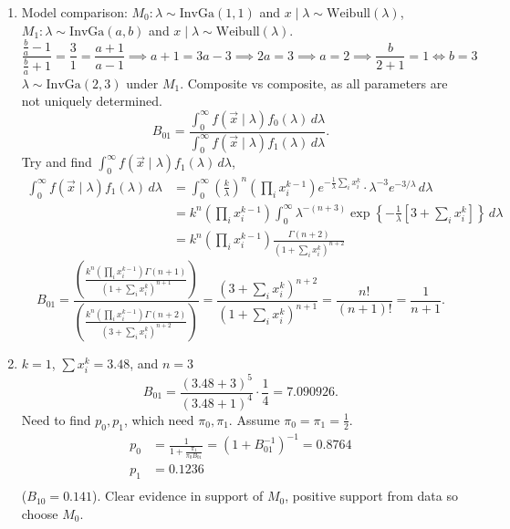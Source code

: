 \documentclass[10pt, a4paper]{article}
\begin{document}
\begin{problem}
\begin{solution}
\begin{enumerate}[label = (\arabic*)]
            \item
            Model comparison:
            $M_0 : \lambda \sim \mathrm{InvGa}(1, 1)$ and $x \mid \lambda \sim \mathrm{Weibull}(\lambda)$,
            $M_1 : \lambda \sim \mathrm{InvGa}(a, b)$ and $x \mid \lambda \sim \mathrm{Weibull}(\lambda)$.
            \[
            \frac{\frac{b}{a} - 1}{\frac{b}{a} + 1} = \frac{3}{1} = \frac{a + 1}{a - 1} \implies a + 1 = 3a - 3 \implies 2a = 3 \implies a = 2 \implies \frac{b}{2 + 1} = 1 \iff b = 3
            \]
            $\lambda \sim \mathrm{InvGa}(2, 3)$ under $M_1$.
            Composite vs composite,
            as all parameters are not uniquely determined.
            \[
            B_{01} = \frac{\int_{0}^{\infty}f(\vec{x} \mid \lambda)f_0(\lambda)\,d\lambda}{\int_{0}^{\infty}f(\vec{x}\mid \lambda)f_1(\lambda)\,d\lambda}.
            \]
            Try and find $\int_{0}^{\infty}f(\vec{x}\mid \lambda)f_1(\lambda)\,d\lambda$,
            \begin{align*}
                \int_{0}^{\infty}f(\vec{x}\mid \lambda)f_1(\lambda)\,d\lambda &= \int_{0}^{\infty}\left(\frac{k}{\lambda}\right) ^ n\left(\prod_{i}x_i ^ {k - 1}\right)e ^ {-\frac{1}{\lambda}\sum_{i}x_i ^ k}\cdot\lambda ^ {-3}e ^ {-3 / \lambda}\,d\lambda \\
                &= k ^ n\left(\prod_{i}x_i ^ {k - 1}\right)\int_{0}^{\infty}\lambda ^ {-(n + 3)}\exp\left\{-\frac{1}{\lambda}\left[3 + \sum_{i}x_i ^ k\right]\right\}\,d\lambda \\
                &= k ^ n\left(\prod_{i}x_i ^ {k - 1}\right)\frac{\Gamma(n + 2)}{\left(1 + \sum_{i}x_i ^ k\right) ^ {n + 2}}
            \end{align*}
            \[
            B_{01} = \frac{\left(\frac{k ^ n\left(\prod_{i}x_i ^ {k - 1}\right)\Gamma(n + 1)}{\left(1 + \sum_{i}x_i ^ k\right) ^ {n + 1}}\right)}{\left(\frac{k ^ n\left(\prod_{i}x_i ^ {k - 1}\right)\Gamma(n + 2)}{\left(3 + \sum_{i}x_i ^ k\right) ^ {n + 2}}\right)} = \frac{\left(3 + \sum_{i}x_i ^ k\right) ^ {n + 2}}{\left(1 + \sum_{i}x_i ^ k\right) ^ {n + 1}} = \frac{n!}{(n + 1)!} = \frac{1}{n + 1}.
            \]

            \item
            $k = 1$,
            $\sum x_i ^ k = 3.48$,
            and $n = 3$
            \[
            B_{01} = \frac{(3.48 + 3) ^ 5}{(3.48 + 1) ^ 4} \cdot \frac{1}{4} = 7.090926.
            \]
            Need to find $p_0, p_1$,
            which need $\pi_0, \pi_1$.
            Assume $\pi_0 = \pi_1 = \frac{1}{2}$.
            \begin{align*}
                p_0 &= \frac{1}{1 + \frac{\pi_1}{\pi_0B_{01}}} = (1 + B_{01} ^ {-1}) ^ {-1} = 0.8764 \\
                p_1 &= 0.1236 \\
            \end{align*}
            ($B_{10} = 0.141$).
            Clear evidence in support of $M_0$,
            positive support from data so choose $M_0$.
        \end{enumerate}
    \end{solution}
\end{problem}
\end{document}
